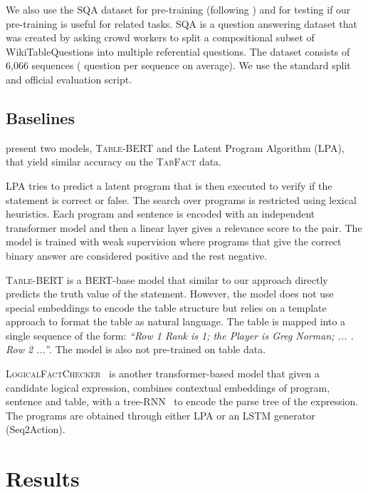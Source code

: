 \documentclass[11pt,a4paper]{article}
\newcommand{\sqa}{\textsc{SQA}\xspace}
\newcommand{\tabfact}{\textsc{TabFact}\xspace}
\newcommand{\bert}{\textsc{BERT}\xspace}
\newcommand{\tablebert}{\textsc{Table-BERT}\xspace}
\newcommand{\lfc}{\textsc{LogicalFactChecker}\xspace}
\theoremstyle{definition}
\begin{document}
We also use the \sqa{} \cite{iyyer-etal-2017-search} dataset for pre-training (following \citet{herzig-2020}) and for testing if our pre-training is useful for related tasks.
\sqa is a question answering dataset that was created by asking crowd workers to split a compositional subset of WikiTableQuestions \cite{pasupat2015compositional} into multiple referential questions.
The dataset consists of 6,066 sequences ( question per sequence on average).
We use the standard split and official evaluation script.

\subsection{Baselines}

\citet{2019TabFactA} present two models, \tablebert and the Latent Program Algorithm (LPA), that yield similar accuracy on the \tabfact data.

LPA tries to predict a latent program that is then executed to verify if the statement is correct or false. The search over programs is restricted using lexical heuristics. Each program and sentence is encoded with an independent transformer model and then a linear layer gives a relevance score to the pair. The model is trained with weak supervision where programs that give the correct binary answer are considered positive and the rest negative.

\tablebert is a \bert{}-base model that similar to our approach directly predicts the truth value of the statement.
However, the model does not use special embeddings to encode the table structure but relies on a template approach to format the table as natural language. The table is mapped into a single sequence of the form: \emph{``Row 1 Rank is 1; the Player is Greg Norman; ... . Row 2 ...''}.
The model is also not pre-trained on table data.

\lfc~\cite{zhong2020logicalfactchecker} is another transformer-based model that given a candidate logical expression, combines contextual embeddings of program, sentence and table, with a tree-RNN~\cite{socher-etal-2013-parsing} to encode the parse tree of the expression. The programs are obtained through either LPA or an LSTM generator (Seq2Action).
 \section{Results}
\end{document}

